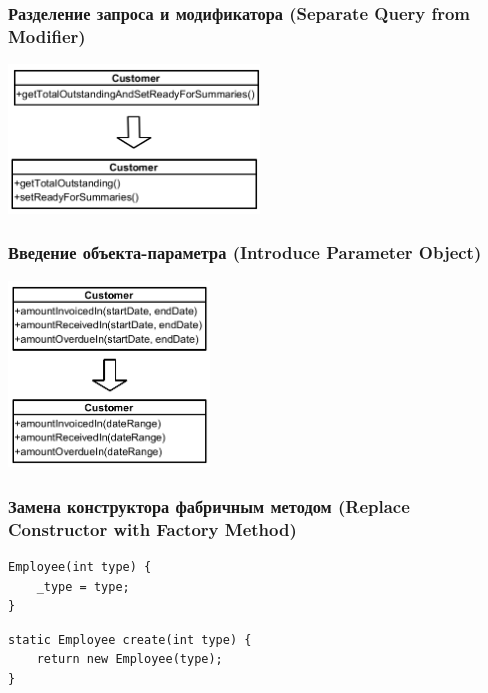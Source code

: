\documentclass{../../slides-style}
\begin{document}
    \begin{frame}
        \frametitle{Разделение запроса и модификатора (Separate Query from Modifier)}
        \begin{center}
            \includegraphics[width=0.5\textwidth]{separateQueryFromModifier.png}
        \end{center}
    \end{frame}

    \begin{frame}
        \frametitle{Введение объекта-параметра (Introduce Parameter Object)}
        \begin{center}
            \includegraphics[width=0.4\textwidth]{introduceParameterObject.png}
        \end{center}
    \end{frame}

    \begin{frame}[fragile]
        \frametitle{Замена конструктора фабричным методом (Replace Constructor with Factory Method)}
        \begin{verbatim}
Employee(int type) {
    _type = type;
}
        \end{verbatim}
        
        \hspace{2cm}{\Huge{$\Downarrow$}}
        
        \begin{verbatim}
static Employee create(int type) {
    return new Employee(type);
}
        \end{verbatim}
    \end{frame}
\end{document}
